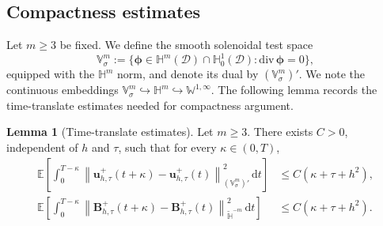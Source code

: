 \documentclass[11pt, reqno]{amsart}
\theoremstyle{definition}
\newtheorem{lemma}[theorem]{Lemma}
\numberwithin{equation}{section}
\newcommand{\divg}{\mathrm{div}\,}
\newcommand{\bff}{\boldsymbol}
\newcommand{\bb}{\mathbb}
\newcommand{\dt}{\,\mathrm{d}t}
\newcommand{\norm}[2]{\left\|{#1}\right\|_{#2}}
\begin{document}
\subsection{Compactness estimates}


Let $m\ge3$ be fixed. We define the smooth solenoidal test space
\[
\bb V^m_\sigma:=\{\bff\phi\in \bb H^m(\mathscr D)\cap \bb H_0^1(\mathscr D):\divg\bff\phi=0\},
\]
equipped with the $\bb H^m$ norm, and denote its dual by $(\bb{V}^m_{\sigma})'$. We note the continuous embeddings $\bb{V}^m_\sigma \hookrightarrow \bb H^m \hookrightarrow \bb W^{1,\infty}$.
The following lemma records the time-translate estimates needed for compactness argument.

\begin{lemma}[Time-translate estimates]
	\label{lem:conv time translation}
	Let $m\ge3$. There exists $C>0$, independent of $h$ and $\tau$, such that
	for every $\kappa\in (0,T)$,
	\begin{align}
		\label{equ:conv time translation u}
		\bb E \left[
		\int_0^{T-\kappa}
		\norm{\bff u_{h,\tau}^{+}(t+\kappa)-\bff u_{h,\tau}^{+}(t)}
		{(\bb V_\sigma^m)'}^2 \dt
		\right]
		&\le C(\kappa+\tau+h^2),
		\\
		\label{equ:conv time translation B}
		\bb E \left[
		\int_0^{T-\kappa}
		\norm{\bff B_{h,\tau}^{+}(t+\kappa)-\bff B_{h,\tau}^{+}(t)}
		{\widetilde{\bb H}^{-m}}^2 \dt
		\right]
		&\le C(\kappa+\tau+h^2).
	\end{align}
\end{lemma}
\end{document}

